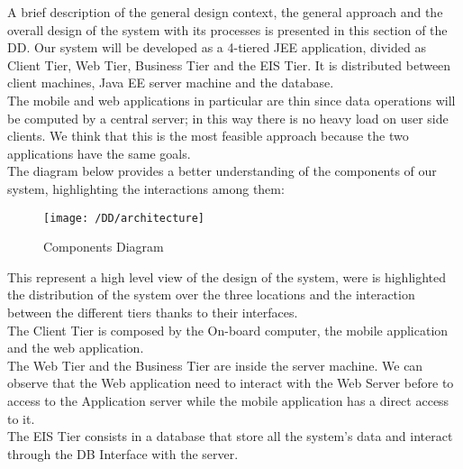 A brief description of the general design context, the general approach and the overall design of the system with its processes is presented in this section of the DD.
Our system will be developed as a 4-tiered JEE application, divided as Client Tier, Web Tier, Business Tier and the EIS Tier. It is distributed between client machines, Java EE server machine and the database.
\\The mobile and web applications in particular are thin since data operations will be computed by a central server; in this way there is no heavy load on user side clients. We think that this is the most feasible approach because the two applications have the same goals. 
\\The diagram below provides a better understanding of the components of our system, highlighting the interactions among them:
\begin{figure}[!ht]
  \centering
  \vspace{0.2cm}
  \texttt{[image: /DD/architecture]}\\
  \vspace{0.4cm}
  \caption{Components Diagram} 
  \label{fig:4-Tier_Architecture} 
\end{figure}

This represent a high level view of the design of the system, were is highlighted the distribution of the system over the three locations and the interaction between the different tiers thanks to their interfaces.
\\The Client Tier is composed by the On-board computer, the mobile application and the web application.
\\The Web Tier and the Business Tier are inside the server machine. We can observe that the Web application need to interact with the Web Server before to access to the Application server while the mobile application has a direct access to it.
\\The EIS Tier consists in a database that store all the system's data and interact through the DB Interface with the server.
